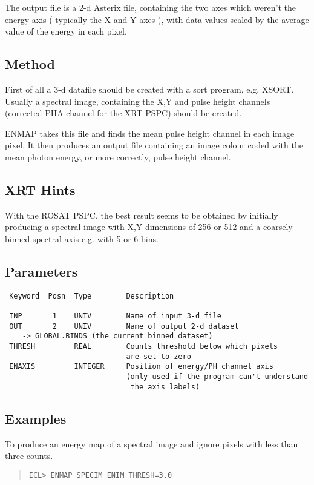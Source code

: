 \documentclass{book}
\renewcommand{\_}{{\tt\char'137}}     %
\begin{document}
The output file is a 2-d Asterix file, containing the two axes which
weren't the energy axis ( typically the X and Y axes ), with data values
scaled by the average value of the energy in each pixel.

\subsection{Method}
First of all a 3-d datafile should be created with a sort program,
e.g. XSORT. Usually a spectral image, containing the X,Y and pulse
height channels (corrected PHA channel for the XRT-PSPC) should be
created.

ENMAP takes this file and finds the mean pulse height channel in each
image pixel. It then produces an output file containing an image colour
coded with the mean photon energy, or more correctly, pulse height
channel.

\subsection{XRT Hints}
With the ROSAT PSPC, the best result seems to be obtained by initially
producing a spectral image with X,Y dimensions of 256 or 512 and
a coarsely binned spectral axis e.g. with 5 or 6 bins.

\subsection{Parameters}
\begin{verbatim}
 Keyword  Posn  Type        Description
 -------  ----  ----        -----------
 INP       1    UNIV        Name of input 3-d file
 OUT       2    UNIV        Name of output 2-d dataset
    -> GLOBAL.BINDS (the current binned dataset)
 THRESH         REAL        Counts threshold below which pixels
                            are set to zero
 ENAXIS         INTEGER     Position of energy/PH channel axis
                            (only used if the program can't understand
                             the axis labels)

\end{verbatim}\subsection{Examples}
To produce an energy map of a spectral image and ignore pixels with
less than three counts.

\begin{quote}\begin{verbatim}
ICL> ENMAP SPECIM ENIM THRESH=3.0
\end{verbatim}\end{quote}
\end{document}
